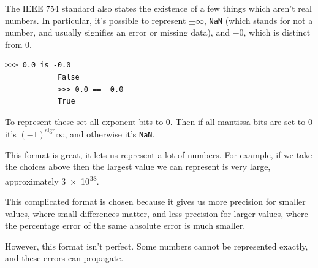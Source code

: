 \documentclass[fleqn]{LectureClass/LectureClass}
\begin{document}
    \begin{remark}{}{}
        The IEEE 754 standard also states the existence of a few things which aren't real numbers.
        In particular, it's possible to represent \(\pm\infty\), \lstinline|NaN| (which stands for not a number, and usually signifies an error or missing data), and \(-0\), which is distinct from \(0\).
        
        \begin{lstlisting}[gobble=12, basicstyle=\color{black!85}\ttfamily]
            >>> 0.0 is -0.0
            False
            >>> 0.0 == -0.0
            True
        \end{lstlisting}
        
        To represent these set all exponent bits to \(0\).
        Then if all mantissa bits are set to \(0\) it's \((-1)^{\text{sign}}\infty\), and otherwise it's \lstinline|NaN|.
    \end{remark}
    
    This format is great, it lets us represent a lot of numbers.
    For example, if we take the choices above then the largest value we can represent is very large, approximately \num{3e38}.
    
    This complicated format is chosen because it gives us more precision for smaller values, where small differences matter, and less precision for larger values, where the percentage error of the same absolute error is much smaller.
    
    However, this format isn't perfect.
    Some numbers cannot be represented exactly, and these errors can propagate.
    
\end{document}
